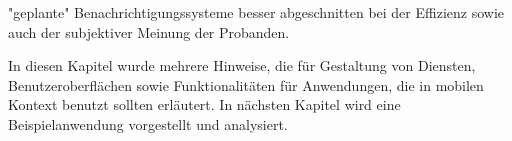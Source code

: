 "geplante" Benachrichtigungssysteme besser abgeschnitten bei der Effizienz sowie auch der subjektiver Meinung der Probanden.


In diesen Kapitel wurde mehrere Hinweise, die für Gestaltung von Diensten, Benutzeroberflächen sowie Funktionalitäten für Anwendungen, die in mobilen Kontext benutzt sollten erläutert. In nächsten Kapitel wird eine Beispielanwendung vorgestellt und analysiert.


